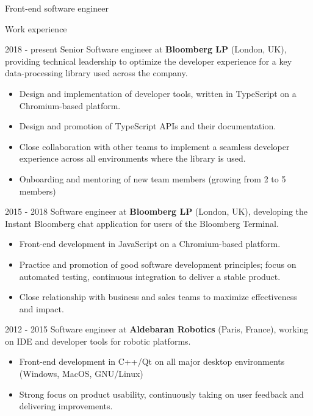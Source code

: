 \documentclass{article}
\begin{document}
\begin{cv}{Front-end software engineer}

\vskip 3mm

\begin{cvlist}{Work experience}
    \item[2018 - present] Senior Software engineer at \textbf{Bloomberg LP}
      (London, UK), providing technical leadership to optimize the developer
      experience for a key data-processing library used across the company.

      \begin{itemize}
      \item Design and implementation of developer tools, written in TypeScript on a Chromium-based platform.
      \item Design and promotion of TypeScript APIs and their documentation.
      \item Close collaboration with other teams to implement a seamless developer experience across all environments where the library is used.
      \item Onboarding and mentoring of new team members (growing from 2 to 5 members)
      \end{itemize}

    \item[2015 - 2018] Software engineer at \textbf{Bloomberg LP} (London, UK),
      developing the Instant Bloomberg chat application for users of the Bloomberg
      Terminal.

      \begin{itemize}
      \item Front-end development in JavaScript on a Chromium-based platform.

      \item Practice and promotion of good software development principles; focus on
      automated testing, continuous integration to deliver a stable product.

      \item Close relationship with business and sales teams to maximize effectiveness and impact.
      \end{itemize}

    \item[2012 - 2015] Software engineer at \textbf{Aldebaran Robotics}
      (Paris, France), working on IDE and developer tools for robotic platforms.

      \begin{itemize}
      \item Front-end development in C++/Qt on all major desktop environments (Windows, MacOS, GNU/Linux)
      \item Strong focus on product usability, continuously taking on user
      feedback and delivering improvements.


\end{itemize}
\end{cvlist}
\end{cv}
\end{document}
